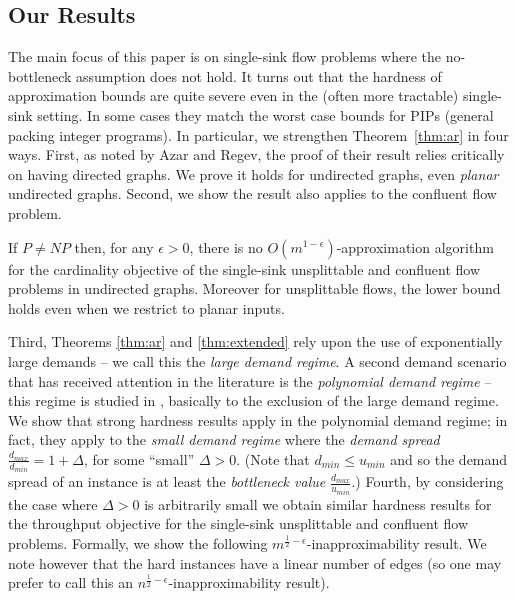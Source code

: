 \documentclass[12pt]{article}
\begin{document}
\subsection{Our Results}\label{sec:results}
The main focus of this paper is on single-sink flow problems where the no-bottleneck assumption
does not hold. It turns out that the hardness of approximation bounds are quite severe
even in the (often more tractable) single-sink setting.
In some cases they  match the worst case bounds for PIPs (general packing integer programs).
In particular, we strengthen Theorem~\ref{thm:ar} in four ways.
First, as noted by Azar and Regev, the proof of their result relies critically
on having directed graphs.
We prove it holds for undirected graphs, even {\em planar} undirected graphs.
Second, we show the result also applies to the confluent
flow problem.
\begin{thm}
\label{thm:extended}
If $P \neq NP$ then, for any $\epsilon > 0$, there is no $O(m^{1-\epsilon})$-approximation algorithm
for the cardinality objective of the single-sink unsplittable and confluent flow problems in undirected graphs.
Moreover for unsplittable flows, the lower bound holds even when we restrict to planar inputs.
\end{thm}

Third, Theorems \ref{thm:ar} and \ref{thm:extended} rely
upon the use of exponentially large demands -- we call this the {\em large demand regime}. A second
demand scenario that has received attention in the literature is the {\em polynomial demand regime} -- this regime
is studied in \cite{guruswami2003near}, basically to the exclusion of the large demand regime.
We show that strong hardness results apply in the polynomial demand regime; in fact,
they apply to the {\em small demand regime} where the {\em demand spread}
 $\frac{d_{max}}{d_{min}} = 1+\Delta$, for some ``small'' $\Delta > 0$.
(Note that $d_{min} \leq u_{min}$ and so the demand spread of an instance is at least
the {\em bottleneck value} $\frac{d_{max}}{u_{min}}$.)
Fourth, by considering the case where $\Delta  > 0$ is arbitrarily small we obtain
similar hardness results for the throughput objective for the single-sink unsplittable
and confluent flow problems.
Formally, we show the following $m^{\frac12 - \epsilon}$-inapproximability result. We
note however that the hard instances have a linear number of edges (so one may prefer to
call this an $n^{\frac12-\epsilon}$-inapproximability result).
\end{document}
